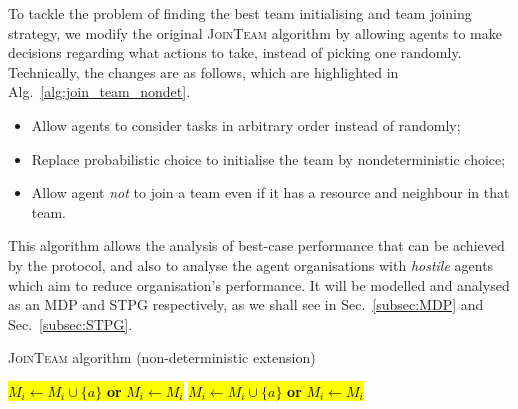 \documentclass{llncs}
\begin{document}
To tackle the problem of finding the best team initialising and team joining strategy, we modify the original \textsc{JoinTeam} algorithm by
allowing agents to make decisions regarding what actions to take, instead of picking one randomly. Technically, the changes are as follows, which
are highlighted in Alg.~\ref{alg:join_team_nondet}.
\begin{itemize}
 \item Allow agents to consider tasks in arbitrary order instead of randomly;
 \item Replace probabilistic choice to initialise the team by nondeterministic choice;
 \item Allow agent \emph{not} to join a team even if it has a resource and neighbour in that team.
\end{itemize}
%
This algorithm allows the analysis of best-case performance that can be achieved by the protocol, and also to analyse the agent organisations with \emph{hostile} agents which aim to reduce organisation's performance. It will be modelled and analysed as an MDP and STPG respectively, as we shall see in Sec.~\ref{subsec:MDP} and Sec.~\ref{subsec:STPG}.
\vspace{-6mm}
\begin{algorithm}[H]
\caption{\textsc{JoinTeam} algorithm (non-deterministic extension)}
\label{alg:join_team_nondet}
\begin{scriptsize}
\begin{algorithmic} 
     
       
	 
	    \State \hl{$M_i \leftarrow M_i \cup \{a\}$  \textbf{or} $M_i \leftarrow M_i$} 
	\EndIf
       
	 
	  \State \hl{$M_i \leftarrow M_i \cup \{a\}$ \textbf{or} $M_i \leftarrow M_i$} 
	\EndIf
      \EndIf
    \EndIf
  \EndFor
\EndProcedure
\end{algorithmic}
\end{scriptsize}
\end{algorithm}
\vspace{-6mm}
\end{document}
